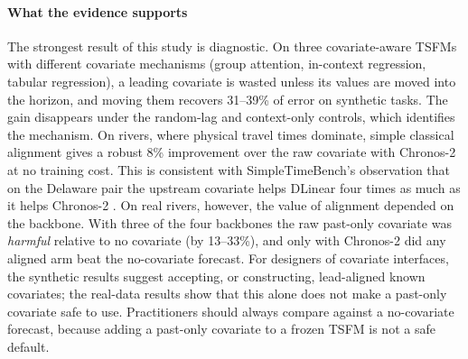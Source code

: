 \documentclass[preprint,11pt,authoryear]{elsarticle}
\begin{document}
\paragraph{What the evidence supports} The strongest result of this study is diagnostic. On three covariate-aware TSFMs with different covariate mechanisms (group attention, in-context regression, tabular regression), a leading covariate is wasted unless its values are moved into the horizon, and moving them recovers 31--39\% of error on synthetic tasks. The gain disappears under the random-lag and context-only controls, which identifies the mechanism. On rivers, where physical travel times dominate, simple classical alignment gives a robust 8\% improvement over the raw covariate with Chronos-2 at no training cost. This is consistent with SimpleTimeBench's observation that on the Delaware pair the upstream covariate helps DLinear four times as much as it helps Chronos-2 \citep{ghoroghchian2026foundations}. On real rivers, however, the value of alignment depended on the backbone. With three of the four backbones the raw past-only covariate was \emph{harmful} relative to no covariate (by 13--33\%), and only with Chronos-2 did any aligned arm beat the no-covariate forecast. For designers of covariate interfaces, the synthetic results suggest accepting, or constructing, lead-aligned known covariates; the real-data results show that this alone does not make a past-only covariate safe to use. Practitioners should always compare against a no-covariate forecast, because adding a past-only covariate to a frozen TSFM is not a safe default.
\end{document}
